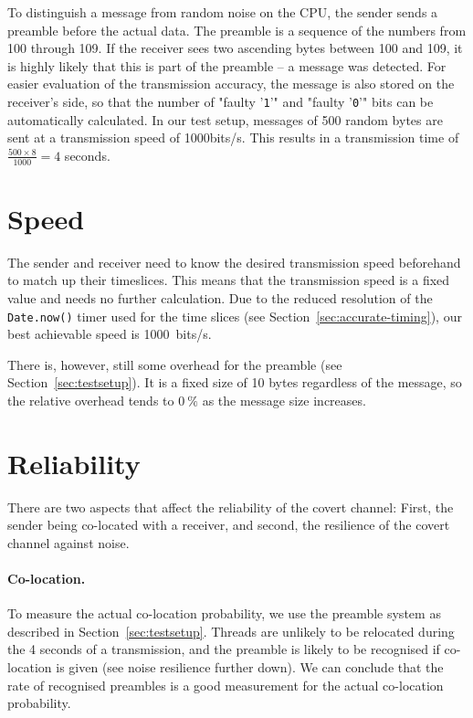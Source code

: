 \documentclass[11pt,
  titlepage=false,
  parskip=half,      %
]{scrreprt}
\begin{document}
To distinguish a message from random noise on the CPU, the sender sends a preamble before the actual data.
The preamble is a sequence of the numbers from 100 through 109.
If the receiver sees two ascending bytes between 100 and 109, it is highly likely that this is part of the preamble --
a message was detected.
For easier evaluation of the transmission accuracy, the message is also stored on the receiver's side,
so that the number of "faulty '\texttt{1}'" and "faulty '\texttt{0}'" bits can be automatically calculated.
In our test setup, messages of 500 random bytes are sent at a transmission speed of 1000bits/s.
This results in a transmission time of $\frac{500 \times 8}{1000} = 4$ seconds.

\section{Speed}
The sender and receiver need to know the desired transmission speed beforehand to match up their timeslices.
This means that the transmission speed is a fixed value and needs no further calculation.
Due to the reduced resolution of the \texttt{Date.now()} timer used for the time slices (see Section~\ref{sec:accurate-timing}),
our best achievable speed is 1000~bits/s.

There is, however, still some overhead for the preamble (see Section~\ref{sec:testsetup}).
It is a fixed size of 10 bytes regardless of the message,
so the relative overhead tends to $0~\%$ as the message size increases.

\section{Reliability}
There are two aspects that affect the reliability of the covert channel:
First, the sender being co-located with a receiver, and second, the resilience of the covert channel against noise.

\paragraph{Co-location.}
To measure the actual co-location probability, we use the preamble system as described in Section~\ref{sec:testsetup}.
Threads are unlikely to be relocated during the 4 seconds of a transmission,
and the preamble is likely to be recognised if co-location is given (see noise resilience further down).
We can conclude that the rate of recognised preambles is a good measurement for the actual co-location probability.
\end{document}
